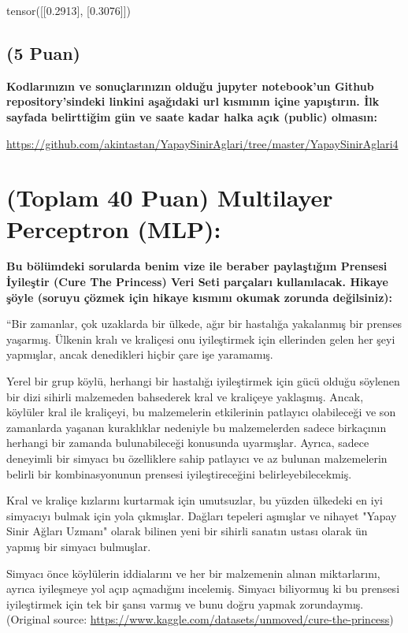 \documentclass[11pt]{article}
\begin{document}
tensor([[0.2913],
        [0.3076]])

\subsection{(5 Puan)} \textbf{Kodlarınızın ve sonuçlarınızın olduğu jupyter notebook'un Github repository'sindeki linkini aşağıdaki url kısmının içine yapıştırın. İlk sayfada belirttiğim gün ve saate kadar halka açık (public) olmasın:}

\url{https://github.com/akintastan/YapaySinirAglari/tree/master/YapaySinirAglari4}

\section{(Toplam 40 Puan) Multilayer Perceptron (MLP):} 
\textbf{Bu bölümdeki sorularda benim vize ile beraber paylaştığım Prensesi İyileştir (Cure The Princess) Veri Seti parçaları kullanılacak. Hikaye şöyle (soruyu çözmek için hikaye kısmını okumak zorunda değilsiniz):} 

``Bir zamanlar, çok uzaklarda bir ülkede, ağır bir hastalığa yakalanmış bir prenses yaşarmış. Ülkenin kralı ve kraliçesi onu iyileştirmek için ellerinden gelen her şeyi yapmışlar, ancak denedikleri hiçbir çare işe yaramamış.

Yerel bir grup köylü, herhangi bir hastalığı iyileştirmek için gücü olduğu söylenen bir dizi sihirli malzemeden bahsederek kral ve kraliçeye yaklaşmış. Ancak, köylüler kral ile kraliçeyi, bu malzemelerin etkilerinin patlayıcı olabileceği ve son zamanlarda yaşanan kuraklıklar nedeniyle bu malzemelerden sadece birkaçının herhangi bir zamanda bulunabileceği konusunda uyarmışlar. Ayrıca, sadece deneyimli bir simyacı bu özelliklere sahip patlayıcı ve az bulunan malzemelerin belirli bir kombinasyonunun prensesi iyileştireceğini belirleyebilecekmiş.

Kral ve kraliçe kızlarını kurtarmak için umutsuzlar, bu yüzden ülkedeki en iyi simyacıyı bulmak için yola çıkmışlar. Dağları tepeleri aşmışlar ve nihayet "Yapay Sinir Ağları Uzmanı" olarak bilinen yeni bir sihirli sanatın ustası olarak ün yapmış bir simyacı bulmuşlar.

Simyacı önce köylülerin iddialarını ve her bir malzemenin alınan miktarlarını, ayrıca iyileşmeye yol açıp açmadığını incelemiş. Simyacı biliyormuş ki bu prensesi iyileştirmek için tek bir şansı varmış ve bunu doğru yapmak zorundaymış. (Original source: \url{https://www.kaggle.com/datasets/unmoved/cure-the-princess})
\end{document}
